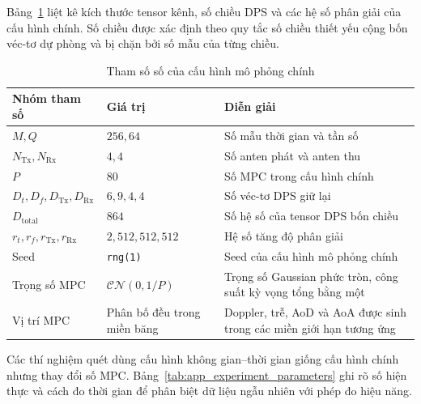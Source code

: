 Bảng~\ref{tab:app_numerical_parameters} liệt kê kích thước tensor kênh, số chiều DPS và các hệ số phân giải của cấu hình chính. Số chiều được xác định theo quy tắc số chiều thiết yếu cộng bốn véc-tơ dự phòng và bị chặn bởi số mẫu của từng chiều.

\begin{table}[H]
    \centering
    \small
    \caption{Tham số số của cấu hình mô phỏng chính}
    \label{tab:app_numerical_parameters}
    \begin{tabularx}{\textwidth}{l l X}
        \toprule
        Nhóm tham số & Giá trị & Diễn giải \\
        \midrule
        \(M,Q\) & \(256,64\) & Số mẫu thời gian và tần số \\
        \(N_{\mathrm{Tx}},N_{\mathrm{Rx}}\) & \(4,4\) & Số anten phát và anten thu \\
        \(P\) & \(80\) & Số MPC trong cấu hình chính \\
        \(D_t,D_f,D_{\mathrm{Tx}},D_{\mathrm{Rx}}\) & \(6,9,4,4\) & Số véc-tơ DPS giữ lại \\
        \(D_{\mathrm{total}}\) & \(864\) & Số hệ số của tensor DPS bốn chiều \\
        \(r_t,r_f,r_{\mathrm{Tx}},r_{\mathrm{Rx}}\) & \(2,512,512,512\) & Hệ số tăng độ phân giải \\
        Seed & \texttt{rng(1)} & Seed của cấu hình mô phỏng chính \\
        Trọng số MPC & \(\mathcal{CN}(0,1/P)\) & Trọng số Gaussian phức tròn, công suất kỳ vọng tổng bằng một \\
        Vị trí MPC & Phân bố đều trong miền băng & Doppler, trễ, AoD và AoA được sinh trong các miền giới hạn tương ứng \\
        \bottomrule
    \end{tabularx}
\end{table}

Các thí nghiệm quét dùng cấu hình không gian--thời gian giống cấu hình chính nhưng thay đổi số MPC. Bảng~\ref{tab:app_experiment_parameters} ghi rõ số hiện thực và cách đo thời gian để phân biệt dữ liệu ngẫu nhiên với phép đo hiệu năng.

